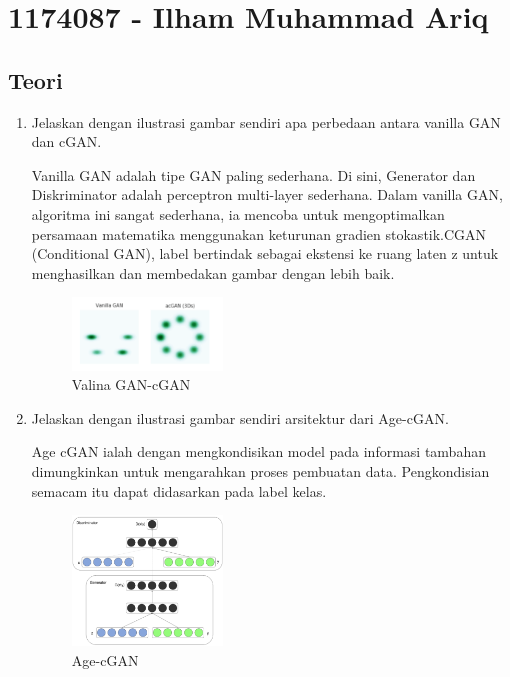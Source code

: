 \section{1174087 - Ilham Muhammad Ariq}

\subsection{Teori}
\begin{enumerate}

        \item Jelaskan dengan ilustrasi gambar sendiri apa perbedaan antara vanilla GAN dan cGAN.

Vanilla GAN adalah tipe GAN paling sederhana. Di sini, Generator dan Diskriminator adalah perceptron multi-layer sederhana. Dalam vanilla GAN, algoritma ini sangat sederhana, ia mencoba untuk mengoptimalkan persamaan matematika menggunakan keturunan gradien stokastik.CGAN (Conditional GAN), label bertindak sebagai ekstensi ke ruang laten z untuk menghasilkan dan membedakan gambar dengan lebih baik. 

	\begin{figure}[H]
            	\includegraphics[width=4cm]{figures/1174087/9/teori1.PNG}
           	\centering
           	\caption{Valina GAN-cGAN}
        	\end{figure}

        \item Jelaskan dengan ilustrasi gambar sendiri arsitektur dari Age-cGAN.

Age cGAN ialah dengan mengkondisikan model pada informasi tambahan dimungkinkan untuk mengarahkan proses pembuatan data. Pengkondisian semacam itu dapat didasarkan pada label kelas.

	\begin{figure}[H]
		\includegraphics[width=4cm]{figures/1174087/9/teori2.PNG}
            	\centering
           	\caption{Age-cGAN}
       	 \end{figure}


\end{enumerate}
